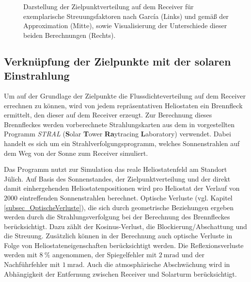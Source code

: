 \begin{figure}[h!]
    \centering
    \setlength{\fboxsep}{1pt}
    \setlength{\fboxrule}{1pt}
    \caption[Darstellung der Zielpunktverteilung auf dem Receiver für exemplarische Streuungsfaktoren nach García und gemäß der Approximation, sowie Visualisierung der Unterschiede dieser beiden Berechnungen.]{Darstellung der Zielpunktverteilung auf dem Receiver für exemplarische Streuungsfaktoren nach García (Links) und gemäß der Approximation (Mitte), sowie Visualisierung der Unterschiede dieser beiden Berechnungen (Rechts).}
    \label{fig_GüteApprox}
\end{figure}

\subsection{Verknüpfung der Zielpunkte mit der solaren Einstrahlung} \label{subsec_VerknüfungZielpunkteEinstrahlung}
Um auf der Grundlage der Zielpunkte die Flussdichteverteilung auf dem Receiver errechnen zu können, wird von jedem repräsentativen Heliostaten ein Brennfleck ermittelt, den dieser auf dem Receiver erzeugt.
Zur Berechnung dieses Brennfleckes werden vorberechnete Strahlungskarten aus dem in \cite[S.53ff]{DissBelhomme} vorgestellten Programm \textit{STRAL} (\textbf{S}olar \textbf{T}ower \textbf{Ra}ytracing \textbf{L}aboratory) verwendet.
Dabei handelt es sich um ein Strahlverfolgungsprogramm, welches Sonnenstrahlen auf dem Weg von der Sonne zum Receiver simuliert.

Das Programm nutzt zur Simulation das reale Heliostatenfeld am Standort Jülich.
Auf Basis des Sonnenstandes, der Zielpunktverteilung und der direkt damit einhergehenden Heliostatenpositionen wird pro Heliostat der Verlauf von $2000$ eintreffenden Sonnenstrahlen berechnet.
Optische Verluste (vgl. Kapitel \ref{subsec_OptischeVerluste}), die sich durch geometrische Beziehungen ergeben werden durch die Strahlungsverfolgung bei der Berechnung des Brennfleckes berücksichtigt.
Dazu zählt der Kosinus-Verlust, die Blockierung/Abschattung und die Streuung.
Zusätzlich können in der Berechnung auch optische Verluste in Folge von Heliostateneigenschaften berücksichtigt werden.
Die Reflexionsverluste werden mit $\SI{8}{\percent}$ angenommen, der Spiegelfehler mit $\SI{2}{\milli\radian}$ und der Nachführfehler mit $\SI{1}{\milli\radian}$.
Auch die atmosphärische Abschwächung wird in Abhängigkeit der Entfernung zwischen Receiver und Solarturm berücksichtigt.

